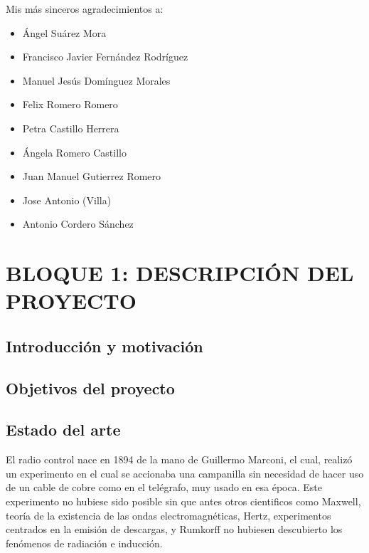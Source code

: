 \documentclass{pclass}
\begin{document}

\hacerportada

	
\frontmatter


Mis más sinceros agradecimientos a:

\begin{itemize}
	\item Ángel Suárez Mora
	\item Francisco Javier Fernández Rodríguez
	\item Manuel Jesús Domínguez Morales
	\item Felix Romero Romero
	\item Petra Castillo Herrera
	\item Ángela Romero Castillo
	\item Juan Manuel Gutierrez Romero
	\item Jose Antonio (Villa)
	\item Antonio Cordero Sánchez
	
\end{itemize}
 

        
	\tableofcontents


	\listoffigures
\mainmatter  


\chapter{BLOQUE 1: DESCRIPCI\'ON DEL PROYECTO}
\section{Introducci\'on y motivaci\'on}
\section{Objetivos del proyecto}
\section{Estado del arte}
El radio control nace en 1894 de la mano de Guillermo Marconi, el cual, realizó un experimento en el cual se accionaba una campanilla sin necesidad de hacer uso de un cable de cobre como en el telégrafo, muy usado en esa época. Este experimento no hubiese sido posible sin que antes otros cientificos como Maxwell, teoría de la existencia de las ondas electromagnéticas, Hertz, experimentos centrados en la emisión de descargas, y Rumkorff no hubiesen descubierto los fenómenos de radiación e inducción.
\end{document}

